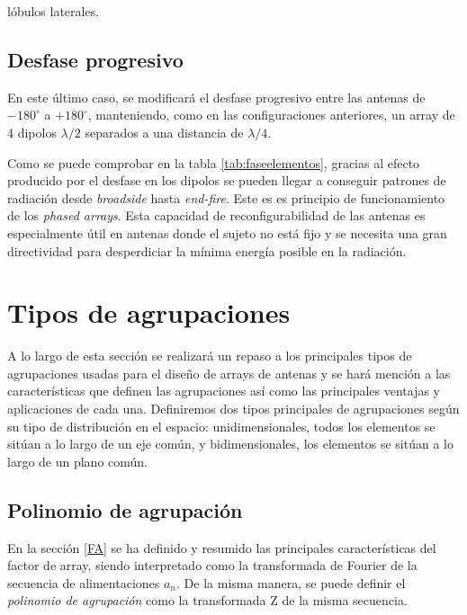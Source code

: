 lóbulos laterales. \cite{Valero2008}






\subsection{Desfase progresivo}
\label{desfasprog}
\par En este último caso, se modificará el desfase progresivo entre las antenas de $-180^{\circ}$ a $+180^{\circ}$, manteniendo, como en las configuraciones anteriores, un array de 4 dipolos $\lambda/2$ separados a una distancia de $\lambda/4$. \cite{Valero2008}
\\
\par Como se puede comprobar en la tabla \ref{tab:faseelementos}, gracias al efecto producido por el desfase en los dipolos se pueden llegar a conseguir patrones de radiación desde \textit{broadside} hasta \textit{end-fire}. Este es es principio de funcionamiento de los \textit{phased arrays}. Esta capacidad de reconfigurabilidad de las antenas es especialmente útil en antenas donde el sujeto no está fijo y se necesita una gran directividad para desperdiciar la mínima energía posible en la radiación.



\newpage
\section{Tipos de agrupaciones}
\par A lo largo de esta sección se realizará un repaso a los principales tipos de agrupaciones usadas para el diseño de arrays de antenas y se hará mención a las características que definen las agrupaciones así como las principales ventajas y aplicaciones de cada una. Definiremos dos tipos principales de agrupaciones según su tipo de distribución en el espacio: unidimensionales, todos los elementos se sitúan a lo largo de un eje común, y bidimensionales, los elementos se sitúan a lo largo de un plano común.

\subsection{Polinomio de agrupación}
\par En la sección \ref{FA} se ha definido y resumido las principales características del factor de array, siendo interpretado como la transformada de Fourier de la secuencia de alimentaciones $a_{n}$. De la misma manera, se puede definir el \textit{polinomio de agrupación} como la transformada Z de la misma secuencia. \cite{Cardama2002}

